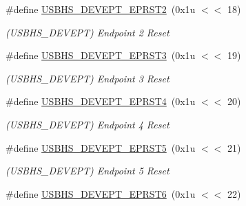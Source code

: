\begin{DoxyCompactItemize}
\mbox{\label{group__SAMS70__USBHS_gabe64f2436583cfadfcb6f9ea4615a793}} 
\#define \mbox{\hyperlink{group__SAMS70__USBHS_gabe64f2436583cfadfcb6f9ea4615a793}{U\+S\+B\+H\+S\+\_\+\+D\+E\+V\+E\+P\+T\+\_\+\+E\+P\+R\+S\+T2}}~(0x1u $<$$<$ 18)
\begin{DoxyCompactList}\small\item\em (U\+S\+B\+H\+S\+\_\+\+D\+E\+V\+E\+PT) Endpoint 2 Reset \end{DoxyCompactList}\item 
\mbox{\label{group__SAMS70__USBHS_gaa53657d7905f8b1def9da56935a73c87}} 
\#define \mbox{\hyperlink{group__SAMS70__USBHS_gaa53657d7905f8b1def9da56935a73c87}{U\+S\+B\+H\+S\+\_\+\+D\+E\+V\+E\+P\+T\+\_\+\+E\+P\+R\+S\+T3}}~(0x1u $<$$<$ 19)
\begin{DoxyCompactList}\small\item\em (U\+S\+B\+H\+S\+\_\+\+D\+E\+V\+E\+PT) Endpoint 3 Reset \end{DoxyCompactList}\item 
\mbox{\label{group__SAMS70__USBHS_ga9fc2be8154c74313a16be3080dc5e995}} 
\#define \mbox{\hyperlink{group__SAMS70__USBHS_ga9fc2be8154c74313a16be3080dc5e995}{U\+S\+B\+H\+S\+\_\+\+D\+E\+V\+E\+P\+T\+\_\+\+E\+P\+R\+S\+T4}}~(0x1u $<$$<$ 20)
\begin{DoxyCompactList}\small\item\em (U\+S\+B\+H\+S\+\_\+\+D\+E\+V\+E\+PT) Endpoint 4 Reset \end{DoxyCompactList}\item 
\mbox{\label{group__SAMS70__USBHS_ga2c82b1cb26f34d93d6a0a9b5c284e5a9}} 
\#define \mbox{\hyperlink{group__SAMS70__USBHS_ga2c82b1cb26f34d93d6a0a9b5c284e5a9}{U\+S\+B\+H\+S\+\_\+\+D\+E\+V\+E\+P\+T\+\_\+\+E\+P\+R\+S\+T5}}~(0x1u $<$$<$ 21)
\begin{DoxyCompactList}\small\item\em (U\+S\+B\+H\+S\+\_\+\+D\+E\+V\+E\+PT) Endpoint 5 Reset \end{DoxyCompactList}\item 
\mbox{\label{group__SAMS70__USBHS_ga835b6246c121bfb9f26785a8e646ccd2}} 
\#define \mbox{\hyperlink{group__SAMS70__USBHS_ga835b6246c121bfb9f26785a8e646ccd2}{U\+S\+B\+H\+S\+\_\+\+D\+E\+V\+E\+P\+T\+\_\+\+E\+P\+R\+S\+T6}}~(0x1u $<$$<$ 22)
$$
\end{DoxyCompactItemize}
